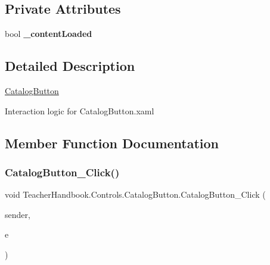 \subsection*{Private Attributes}
\begin{DoxyCompactItemize}
\item 
\mbox{\label{class_teacher_handbook_1_1_controls_1_1_catalog_button_a4d31da551e1ef4555ef13f04afd6342c}} 
bool {\bfseries \+\_\+content\+Loaded}
\end{DoxyCompactItemize}


\subsection{Detailed Description}
\mbox{\hyperlink{class_teacher_handbook_1_1_controls_1_1_catalog_button}{Catalog\+Button}} 

Interaction logic for Catalog\+Button.\+xaml 

\subsection{Member Function Documentation}
\mbox{\label{class_teacher_handbook_1_1_controls_1_1_catalog_button_ab6fdcafe2b97c645486d1ca83109c979}} 
\subsubsection{\texorpdfstring{Catalog\+Button\+\_\+\+Click()}{CatalogButton\_Click()}}
{\footnotesize\ttfamily void Teacher\+Handbook.\+Controls.\+Catalog\+Button.\+Catalog\+Button\+\_\+\+Click (\begin{DoxyParamCaption}\item[{object}]{sender,  }\item[{Routed\+Event\+Args}]{e }\end{DoxyParamCaption})\hspace{0.3cm}{\ttfamily [private]}}



